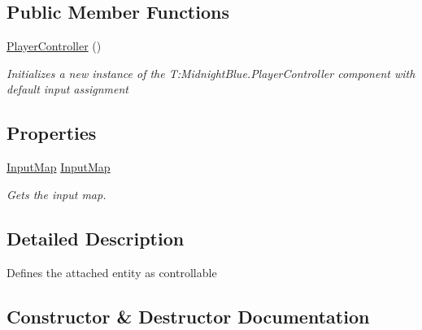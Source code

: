 \subsection*{Public Member Functions}
\begin{DoxyCompactItemize}
\item 
\hyperlink{class_midnight_blue_1_1_engine_1_1_entity_component_1_1_player_controller_aa68df94f019c5e6fb473bc47e3cdefca}{Player\+Controller} ()
\begin{DoxyCompactList}\small\item\em Initializes a new instance of the T\+:\+Midnight\+Blue.\+Player\+Controller component with default input assignment \end{DoxyCompactList}\end{DoxyCompactItemize}
\subsection*{Properties}
\begin{DoxyCompactItemize}
\item 
\hyperlink{class_midnight_blue_1_1_engine_1_1_i_o_1_1_input_map}{Input\+Map} \hyperlink{class_midnight_blue_1_1_engine_1_1_entity_component_1_1_player_controller_ad577945f15d3e6b4c1282493cc53b6d9}{Input\+Map}
\begin{DoxyCompactList}\small\item\em Gets the input map. \end{DoxyCompactList}\end{DoxyCompactItemize}


\subsection{Detailed Description}
Defines the attached entity as controllable 



\subsection{Constructor \& Destructor Documentation}
\hypertarget{class_midnight_blue_1_1_engine_1_1_entity_component_1_1_player_controller_aa68df94f019c5e6fb473bc47e3cdefca}{}\label{class_midnight_blue_1_1_engine_1_1_entity_component_1_1_player_controller_aa68df94f019c5e6fb473bc47e3cdefca} 
